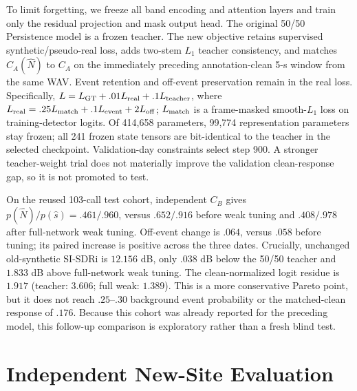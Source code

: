 \documentclass[conference]{IEEEtran}
\begin{document}
To limit forgetting, we freeze all band encoding and attention layers and
train only the residual projection and mask output head. The original 50/50
Persistence model is a frozen teacher. The new objective retains supervised
synthetic/pseudo-real loss, adds two-stem $L_1$ teacher consistency, and
matches $C_A(\hat N)$ to $C_A$ on the immediately preceding annotation-clean
5-s window from the same WAV. Event retention and off-event preservation
remain in the real loss. Specifically,
$L=L_{\rm GT}+.01L_{\rm real}+.1L_{\rm teacher}$, where
$L_{\rm real}=.25L_{\rm match}+.1L_{\rm event}+2L_{\rm off}$;
$L_{\rm match}$ is a frame-masked smooth-$L_1$ loss on training-detector
logits. Of 414,658 parameters, 99,774 representation
parameters stay frozen; all 241 frozen state tensors are bit-identical to
the teacher in the selected checkpoint. Validation-day constraints select
step 900. A stronger teacher-weight trial does not materially improve the
validation clean-response gap, so it is not promoted to test.

On the reused 103-call test cohort, independent $C_B$ gives
$p(\hat N)/p(\hat s)=.461/.960$, versus $.652/.916$ before weak tuning and
$.408/.978$ after full-network weak tuning. Off-event change is $.064$,
versus $.058$ before tuning; its paired increase is positive across the
three dates. Crucially, unchanged old-synthetic SI-SDRi is $12.156$ dB,
only $.038$ dB below the 50/50 teacher and $1.833$ dB above full-network
weak tuning. The clean-normalized logit residue is $1.917$ (teacher:
$3.606$; full weak: $1.389$). This is a more conservative Pareto point,
but it does not reach $.25$--$.30$ background event probability or the
matched-clean response of $.176$. Because this cohort was already reported
for the preceding model, this follow-up comparison is exploratory rather
than a fresh blind test.

\section{Independent New-Site Evaluation}\label{sec:holdout}
\end{document}
